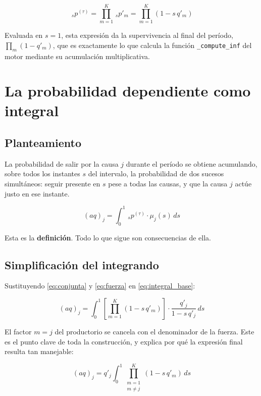 \documentclass[a4paper, 12pt]{article}
\begin{document}
\begin{equation}
\,_sp^{(\tau)} = \prod_{m=1}^{K} \,_sp'_m = \prod_{m=1}^{K} (1 - s\,q'_m)
\label{eq:conjunta}
\end{equation}

Evaluada en $s=1$, esta expresión da la supervivencia al final del período, $\prod_m (1-q'_m)$, que es exactamente lo que calcula la función \texttt{\_compute\_inf} del motor mediante su acumulación multiplicativa.

\newpage

\section{La probabilidad dependiente como integral}

\subsection{Planteamiento}

La probabilidad de salir por la causa $j$ durante el período se obtiene acumulando, sobre todos los instantes $s$ del intervalo, la probabilidad de dos sucesos simultáneos: seguir presente en $s$ pese a todas las causas, y que la causa $j$ actúe justo en ese instante.

\begin{equation}
(aq)_j = \int_0^1 \,_sp^{(\tau)} \cdot \mu_j(s)\, ds
\label{eq:integral_base}
\end{equation}

Esta es la \textbf{definición}. Todo lo que sigue son consecuencias de ella.

\subsection{Simplificación del integrando}

Sustituyendo \eqref{eq:conjunta} y \eqref{eq:fuerza} en \eqref{eq:integral_base}:

\begin{equation}
(aq)_j = \int_0^1 \left[\prod_{m=1}^{K} (1 - s\,q'_m)\right] \cdot \frac{q'_j}{1 - s\,q'_j}\, ds
\end{equation}

El factor $m=j$ del productorio se cancela con el denominador de la fuerza. Este es el punto clave de toda la construcción, y explica por qué la expresión final resulta tan manejable:

\begin{equation}
\boxed{\;(aq)_j = q'_j \int_0^1 \prod_{\substack{m=1 \\ m \neq j}}^{K} (1 - s\,q'_m)\, ds\;}
\label{eq:integral_limpia}
\end{equation}
\end{document}
